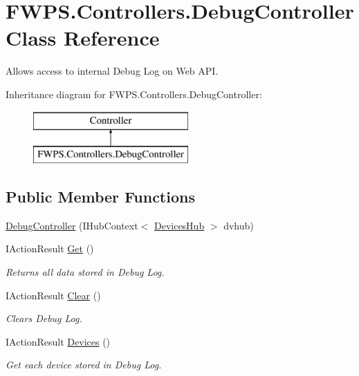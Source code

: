 \hypertarget{class_f_w_p_s_1_1_controllers_1_1_debug_controller}{}\section{F\+W\+P\+S.\+Controllers.\+Debug\+Controller Class Reference}
\label{class_f_w_p_s_1_1_controllers_1_1_debug_controller}


Allows access to internal Debug Log on Web A\+PI.  


Inheritance diagram for F\+W\+P\+S.\+Controllers.\+Debug\+Controller\+:\begin{figure}[H]
\begin{center}
\leavevmode
\includegraphics[height=2.000000cm]{class_f_w_p_s_1_1_controllers_1_1_debug_controller}
\end{center}
\end{figure}
\subsection*{Public Member Functions}
\begin{DoxyCompactItemize}
\item 
\mbox{\hyperlink{class_f_w_p_s_1_1_controllers_1_1_debug_controller_a170ad002d9604b8b7288780876cdd749}{Debug\+Controller}} (I\+Hub\+Context$<$ \mbox{\hyperlink{class_f_w_p_s_1_1_devices_hub}{Devices\+Hub}} $>$ dvhub)
\item 
I\+Action\+Result \mbox{\hyperlink{class_f_w_p_s_1_1_controllers_1_1_debug_controller_a2cb38aa6a0759e89ba745e7b02db37f9}{Get}} ()
\begin{DoxyCompactList}\small\item\em Returns all data stored in Debug Log. \end{DoxyCompactList}\item 
I\+Action\+Result \mbox{\hyperlink{class_f_w_p_s_1_1_controllers_1_1_debug_controller_a6b023fe7e63e0cdd665c151bed5e5ed1}{Clear}} ()
\begin{DoxyCompactList}\small\item\em Clears Debug Log. \end{DoxyCompactList}\item 
I\+Action\+Result \mbox{\hyperlink{class_f_w_p_s_1_1_controllers_1_1_debug_controller_a43de8949791ed24a59188323e1e9f9cd}{Devices}} ()
\begin{DoxyCompactList}\small\item\em Get each device stored in Debug Log. \end{DoxyCompactList}\end{DoxyCompactItemize}
